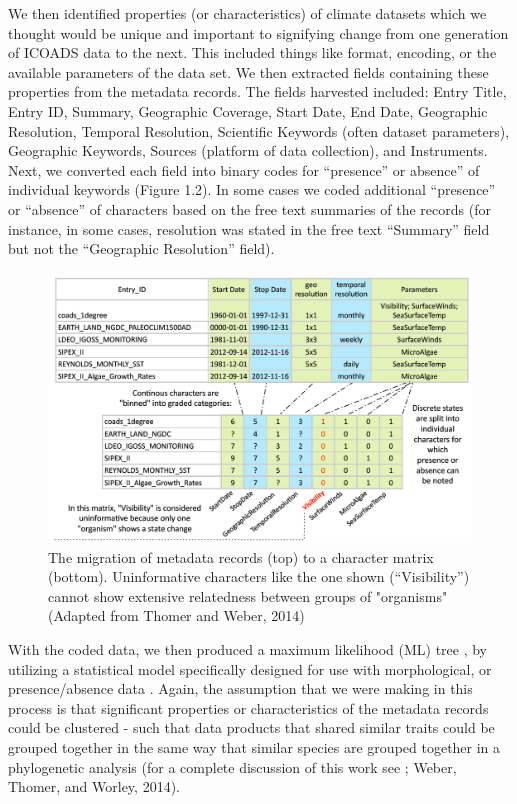 \documentclass[thesis,tocnosub,noragright,centerchapter,12pt]{uiucecethesis09}
\begin{document}
We then identified properties (or characteristics) of climate datasets
which we thought would be unique and important to signifying change from
one generation of ICOADS data to the next. This included things like
format, encoding, or the available parameters of the data set. We then
extracted fields containing these properties from the metadata
records. The fields harvested included: Entry Title, Entry ID, Summary,
Geographic Coverage, Start Date, End Date, Geographic Resolution,
Temporal Resolution, Scientific Keywords (often dataset parameters),
Geographic Keywords, Sources (platform of data collection), and
Instruments.\\

Next, we converted each field into binary codes for ``presence'' or
absence'' of individual keywords (Figure 1.2). In some cases we coded
additional ``presence'' or ``absence'' of characters based on the free
text summaries of the records (for instance, in some cases, resolution
was stated in the free text ``Summary'' field but not the ``Geographic
Resolution'' field).\\

\begin{figure}[t]
\includegraphics[width=\textwidth]{ICOADS_Coding}
\caption{The migration of metadata records (top) to a character matrix (bottom). Uninformative characters like the
one shown (“Visibility”) cannot show extensive relatedness between groups of "organisms" (Adapted from Thomer and Weber, 2014)}
\label{fig:my_label}
\end{figure}


With the coded data, we then produced a maximum likelihood (ML) tree
\citep{felsenstein1981evolutionary}, by utilizing a statistical model specifically
designed for use with morphological, or presence/absence data \citep{lewis2001likelihood}. Again, the assumption that we were making in this process is that
significant properties or characteristics of the metadata records could
be clustered - such that data products that shared similar traits could
be grouped together in the same way that similar species are grouped
together in a phylogenetic analysis (for a complete discussion of this
work see  \cite{thomer2014phylo}; Weber, Thomer, and Worley, 2014).\\
\end{document}
